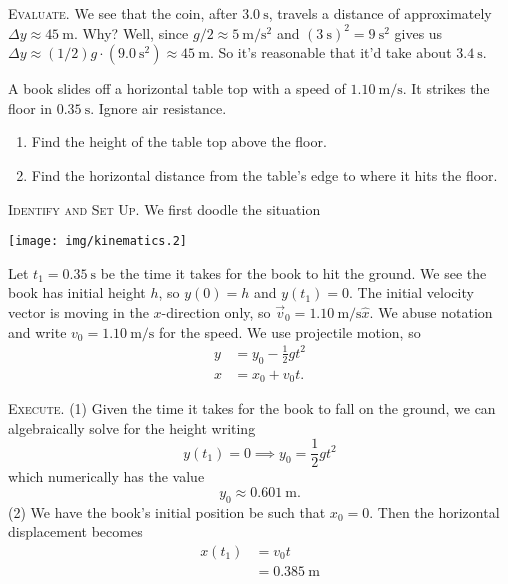\textsc{Evaluate.}
We see that the coin, after $\SI{3.0}{\second}$, travels a distance
of approximately $\Delta y\approx \SI{45}{\meter}$. Why? Well,
since $g/2\approx \SI{5}{\meter/\second\squared}$ and 
$(\SI{3}{\second})^{2}=\SI{9}{\second\squared}$ gives us $\Delta y\approx(1/2)g\cdot(\SI{9.0}{\second\squared})\approx \SI{45}{\meter}$. So it's
reasonable that it'd take about $\SI{3.4}{\second}$.


A book slides off a horizontal table top with a speed of
$\SI{1.10}{\meter/\second}$. It strikes the floor in
$\SI{0.35}{\second}$. Ignore air resistance.
\begin{enumerate}
\item Find the height of the table top above the floor.
\item Find the horizontal distance from the table's edge to where it
  hits the floor.
\end{enumerate}

\textsc{Identify and Set Up.}
We first doodle the situation
\begin{center}
\texttt{[image: img/kinematics.2]}
\end{center}
Let $t_{1}=\SI{0.35}{\second}$ be the time it takes for the book to hit
the ground. We see the book has initial height $h$, so $y(0)=h$ and
$y(t_{1})=0$. The initial velocity vector is moving in the $x$-direction
only, so $\vec{v}_{0}=\SI{1.10}{\meter\per\second}\hat{x}$. We abuse
notation and write $v_{0}=\SI{1.10}{\meter\per\second}$ for the speed. We use
projectile motion, so
\begin{equation*}
\begin{split}
y &= y_{0} - \frac{1}{2}gt^{2}\\
x &= x_{0} + v_{0}t.
\end{split}
\end{equation*}

\textsc{Execute.} (1) Given the time it takes for the book to fall on the
ground, we can algebraically solve for the height writing
\begin{equation}
y(t_{1})=0\implies y_{0}=\frac{1}{2}gt^{2}
\end{equation}
which numerically has the value
\begin{equation}
y_{0}\approx \SI{0.601}{\meter}.
\end{equation}
(2) We have the book's initial position be such that $x_{0}=0$. Then the
horizontal displacement becomes
\begin{equation}
\begin{split}
x(t_{1}) &= v_{0}t\\
&= \SI{0.385}{\meter}
\end{split}
\end{equation}

